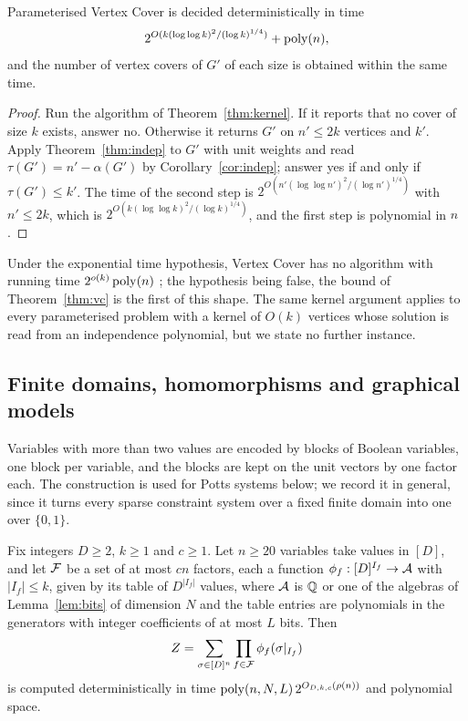 \begin{theorem}\label{thm:vc}
Parameterised Vertex Cover is decided deterministically in time
\[
  2^{O(k(\log\log k)^2/(\log k)^{1/4})}+\operatorname{poly}(n),
\]
and the number of vertex covers of $G'$ of each size is obtained within the
same time.
\end{theorem}

\begin{proof}
Run the algorithm of Theorem~\ref{thm:kernel}. If it reports that no cover of
size $k$ exists, answer no. Otherwise it returns $G'$ on $n'\le2k$ vertices and
$k'$. Apply Theorem~\ref{thm:indep} to $G'$ with unit weights and read
$\tau(G')=n'-\alpha(G')$ by Corollary~\ref{cor:indep}; answer yes if and only if
$\tau(G')\le k'$. The time of the second step is
$2^{O(n'(\log\log n')^2/(\log n')^{1/4})}$ with $n'\le2k$, which is
$2^{O(k(\log\log k)^2/(\log k)^{1/4})}$, and the first step is polynomial in $n$.
\end{proof}

\begin{remark}
Under the exponential time hypothesis, Vertex Cover has no algorithm with
running time $2^{o(k)}\operatorname{poly}(n)$ \cite[Theorem 14.6]{CFKLMPPS15}; the hypothesis
being false, the bound of Theorem~\ref{thm:vc} is the first of this shape. The
same kernel argument applies to every parameterised problem with a kernel of
$O(k)$ vertices whose solution is read from an independence polynomial, but we
state no further instance.
\end{remark}

\subsection{Finite domains, homomorphisms and graphical models}\label{ssec:domain}
Variables with more than two values are encoded by blocks of Boolean
variables, one block per variable, and the blocks are kept on the unit vectors
by one factor each. The construction is used for Potts systems below; we
record it in general, since it turns every sparse constraint system over a
fixed finite domain into one over $\{0,1\}$.

\begin{theorem}\label{thm:domain}
Fix integers $D\ge2$, $k\ge1$ and $c\ge1$. Let $n\ge20$ variables take values
in $[D]$, and let $\mathcal{F}$ be a set of at most $cn$ factors, each a function
$\phi_f:[D]^{I_f}\to\mathcal{A}$ with $|I_f|\le k$, given by its table of $D^{|I_f|}$
values, where $\mathcal{A}$ is $\mathbb{Q}$ or one of the algebras of Lemma~\ref{lem:bits} of
dimension $N$ and the table entries are polynomials in the generators with
integer coefficients of at most $L$ bits. Then
\[
  Z=\sum_{\sigma\in[D]^n}\prod_{f\in\mathcal{F}}\phi_f(\sigma|_{I_f})
\]
is computed deterministically in time $\operatorname{poly}(n,N,L)\,2^{O_{D,k,c}(\rho(n))}$ and
polynomial space.
\end{theorem}

